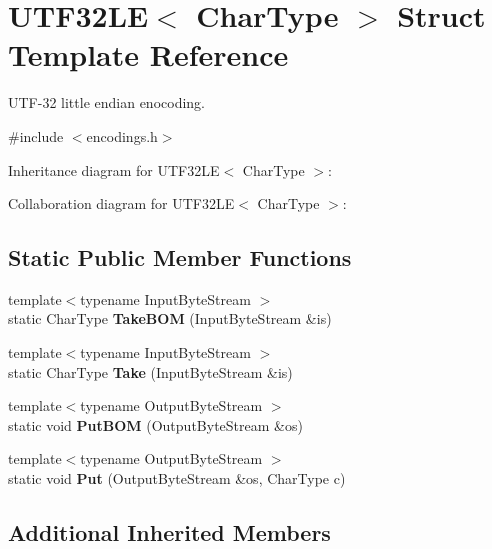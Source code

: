 \hypertarget{struct_u_t_f32_l_e}{}\section{U\+T\+F32\+LE$<$ Char\+Type $>$ Struct Template Reference}
\label{struct_u_t_f32_l_e}


U\+T\+F-\/32 little endian enocoding.  




{\ttfamily \#include $<$encodings.\+h$>$}



Inheritance diagram for U\+T\+F32\+LE$<$ Char\+Type $>$\+:


Collaboration diagram for U\+T\+F32\+LE$<$ Char\+Type $>$\+:
\subsection*{Static Public Member Functions}
\begin{DoxyCompactItemize}
\item 
\mbox{\label{struct_u_t_f32_l_e_a8729612b0a8b1126c61c4f8f8c34410e}} 
{\footnotesize template$<$typename Input\+Byte\+Stream $>$ }\\static Char\+Type {\bfseries Take\+B\+OM} (Input\+Byte\+Stream \&is)
\item 
\mbox{\label{struct_u_t_f32_l_e_ad13967549811be12897362bb37b2c819}} 
{\footnotesize template$<$typename Input\+Byte\+Stream $>$ }\\static Char\+Type {\bfseries Take} (Input\+Byte\+Stream \&is)
\item 
\mbox{\label{struct_u_t_f32_l_e_accd97d45e55746c900dab356605825be}} 
{\footnotesize template$<$typename Output\+Byte\+Stream $>$ }\\static void {\bfseries Put\+B\+OM} (Output\+Byte\+Stream \&os)
\item 
\mbox{\label{struct_u_t_f32_l_e_a61bb50e7fba27e3fe28a9f30eb366193}} 
{\footnotesize template$<$typename Output\+Byte\+Stream $>$ }\\static void {\bfseries Put} (Output\+Byte\+Stream \&os, Char\+Type c)
\end{DoxyCompactItemize}
\subsection*{Additional Inherited Members}


